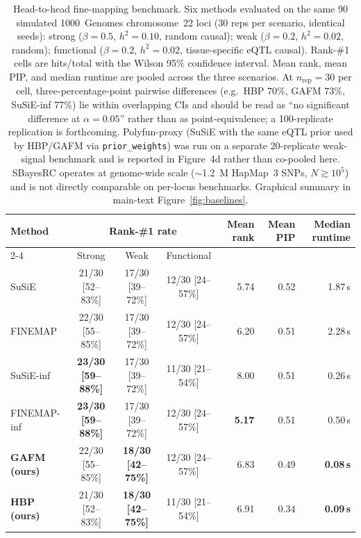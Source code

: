 \begin{table}[htbp]
\centering
\footnotesize
\setlength{\tabcolsep}{5pt}
\begin{tabular}{lcccrrr}
\toprule
\multirow{2}{*}{Method} & \multicolumn{3}{c}{Rank-\#1 rate} & \multirow{2}{*}{Mean rank} & \multirow{2}{*}{Mean PIP} & \multirow{2}{*}{Median runtime} \\
\cmidrule(lr){2-4}
                       & Strong & Weak & Functional &           &           & \\
\midrule
SuSiE                              & 21/30 [52--83\%] & 17/30 [39--72\%] & 12/30 [24--57\%] & 5.74 & 0.52 & 1.87\,s \\
FINEMAP                            & 22/30 [55--85\%] & 17/30 [39--72\%] & 12/30 [24--57\%] & 6.20 & 0.51 & 2.28\,s \\
SuSiE-inf                          & \textbf{23/30 [59--88\%]} & 17/30 [39--72\%] & 11/30 [21--54\%] & 8.00 & 0.51 & 0.26\,s \\
FINEMAP-inf                        & \textbf{23/30 [59--88\%]} & 17/30 [39--72\%] & 12/30 [24--57\%] & \textbf{5.17} & 0.51 & 0.50\,s \\
\textbf{GAFM (ours)}               & 22/30 [55--85\%] & \textbf{18/30 [42--75\%]} & 12/30 [24--57\%] & 6.83 & 0.49 & \textbf{0.08\,s} \\
\textbf{HBP (ours)}                & 21/30 [52--83\%] & \textbf{18/30 [42--75\%]} & 11/30 [21--54\%] & 6.91 & 0.34 & \textbf{0.09\,s} \\
\bottomrule
\end{tabular}
\caption{Head-to-head fine-mapping benchmark. Six methods
evaluated on the same 90 simulated 1000~Genomes chromosome~22 loci
(30 reps per scenario, identical seeds): strong
($\beta{=}0.5$, $h^2{=}0.10$, random causal); weak ($\beta{=}0.2$,
$h^2{=}0.02$, random); functional ($\beta{=}0.2$, $h^2{=}0.02$,
tissue-specific eQTL causal). Rank-\#1 cells are
hits/total with the Wilson 95\% confidence interval. Mean rank,
mean PIP, and median runtime are pooled across the three scenarios.
At $n_{\text{rep}}=30$ per cell, three-percentage-point pairwise
differences (e.g.\ HBP 70\%, GAFM 73\%, SuSiE-inf 77\%) lie within
overlapping CIs and should be read as ``no significant difference
at $\alpha=0.05$'' rather than as point-equivalence; a
100-replicate replication is forthcoming. Polyfun-proxy (SuSiE with the same eQTL
prior used by HBP/GAFM via \texttt{prior\_weights}) was run on a
separate 20-replicate weak-signal benchmark and is reported in
Figure~4d rather than co-pooled here. SBayesRC operates at
genome-wide scale ($\sim$1.2~M HapMap~3 SNPs, $N \gtrsim 10^5$) and
is not directly comparable on per-locus benchmarks. Graphical
summary in main-text Figure~\ref{fig:baselines}.}
\label{tab:sup_baselines}
\end{table}

